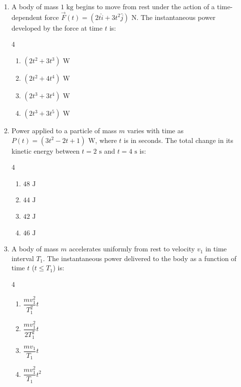 \documentclass[11pt,a4paper]{article}
\begin{document}
\begin{enumerate}[label=\textbf{\arabic*.},leftmargin=18pt,itemsep=8pt,resume]
  \item A body of mass $1\text{ kg}$ begins to move from rest under the action of a time-dependent force $\vec{F}(t) = (2t\hat{i} + 3t^2\hat{j})\text{ N}$. The instantaneous power developed by the force at time $t$ is:
  \begin{multicols}{4}
    \begin{enumerate}[label=(\Alph*)]
      \item $(2t^2 + 3t^3)\text{ W}$
      \item $(2t^2 + 4t^4)\text{ W}$
      \item $(2t^3 + 3t^4)\text{ W}$
      \item $(2t^3 + 3t^5)\text{ W}$
    \end{enumerate}
  \end{multicols}

  \item Power applied to a particle of mass $m$ varies with time as $P(t) = (3t^2 - 2t + 1)\text{ W}$, where $t$ is in seconds. The total change in its kinetic energy between $t = 2\text{ s}$ and $t = 4\text{ s}$ is:
  \begin{multicols}{4}
    \begin{enumerate}[label=(\Alph*)]
      \item $48\text{ J}$
      \item $44\text{ J}$
      \item $42\text{ J}$
      \item $46\text{ J}$
    \end{enumerate}
  \end{multicols}

  \item A body of mass $m$ accelerates uniformly from rest to velocity $v_1$ in time interval $T_1$. The instantaneous power delivered to the body as a function of time $t$ ($t \le T_1$) is:
  \begin{multicols}{4}
    \begin{enumerate}[label=(\Alph*)]
      \item $\dfrac{m v_1^2}{T_1^2} t$
      \item $\dfrac{m v_1^2}{2T_1^2} t$
      \item $\dfrac{m v_1}{T_1} t$
      \item $\dfrac{m v_1^2}{T_1} t^2$
    \end{enumerate}
  \end{multicols}


\end{enumerate}
\end{document}
